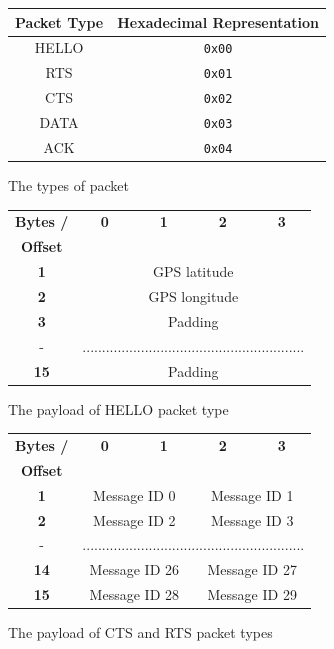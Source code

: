 \documentclass[12pt,a4paper]{report}
\begin{document}
\begin{figure}[h]
\begin{center}
\begin{tabular}{ |c|c| } 
\hline
\textbf{Packet Type} &  \textbf{Hexadecimal Representation} \\
\hline
HELLO & \verb'0x00' \\ 
\hline
RTS &  \verb'0x01'  \\ 
\hline
CTS &   \verb'0x02'  \\
\hline
DATA &  \verb'0x03' \\
\hline
ACK &  \verb'0x04' \\
\hline
\end{tabular}
\end{center}
\caption{The types of packet}
\end{figure}


\begin{figure}[h]
\begin{center}
\begin{tabular}{ |c|c|c|c|c| }
\hline
\textbf{Bytes /} & \textbf{0} & \textbf{1} & \textbf{2} & \textbf{3} \\ 
\textbf{Offset} &  &  &  &  \\ 
\hline
\textbf{1} &     \multicolumn{4}{c|}{GPS latitude}  \\ 
\hline
\textbf{2} &     \multicolumn{4}{c|}{GPS longitude}  \\
\hline
\textbf{3} &     \multicolumn{4}{c|}{Padding}  \\
\hline
 - & \multicolumn{4}{c|}{.........................................................}  \\
 \hline
\textbf{15} &     \multicolumn{4}{c|}{Padding}  \\
\hline
\end{tabular}
\end{center}
\caption{The payload of HELLO packet type}
\end{figure}

\begin{figure}[h]
\begin{center}\begin{tabular}{ |c|c|c|c|c| }
\hline
\textbf{Bytes /} & \textbf{0} & \textbf{1} & \textbf{2} & \textbf{3} \\ 
\textbf{Offset} &  &  &  &  \\ 
\hline
\textbf{1} &     \multicolumn{2}{c|}{Message ID 0}  & \multicolumn{2}{c|}{Message ID 1}  \\ 
\hline
\textbf{2} &  \multicolumn{2}{c|}{Message ID 2}  & \multicolumn{2}{c|}{Message ID 3}   \\
\hline
 - & \multicolumn{4}{c|}{.........................................................}  \\
 \hline
 \textbf{14} &  \multicolumn{2}{c|}{Message ID 26}  & \multicolumn{2}{c|}{Message ID 27}   \\
\hline
\textbf{15} &   \multicolumn{2}{c|}{Message ID 28}  & \multicolumn{2}{c|}{Message ID 29}   \\
\hline
\end{tabular}
\end{center}
\caption{The payload of CTS and RTS packet types}
\end{figure}
\end{document}
